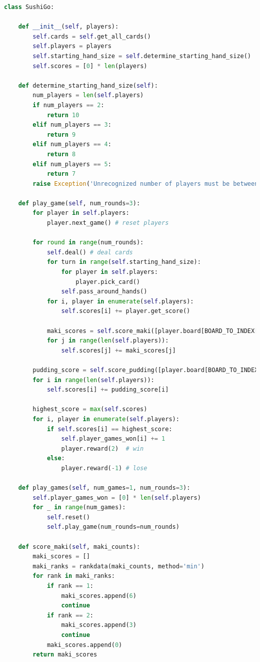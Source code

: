\begin{lstlisting}[language=Python]
class SushiGo:

    def __init__(self, players):
        self.cards = self.get_all_cards()
        self.players = players
        self.starting_hand_size = self.determine_starting_hand_size()
        self.scores = [0] * len(players)
    
    def determine_starting_hand_size(self):
        num_players = len(self.players)
        if num_players == 2:
            return 10
        elif num_players == 3:
            return 9
        elif num_players == 4:
            return 8
        elif num_players == 5:
            return 7
        raise Exception('Unrecognized number of players must be between 2 - 5 players')

    def play_game(self, num_rounds=3):
        for player in self.players: 
            player.next_game() # reset players

        for round in range(num_rounds):
            self.deal() # deal cards
            for turn in range(self.starting_hand_size):
                for player in self.players: 
                    player.pick_card()
                self.pass_around_hands()
            for i, player in enumerate(self.players): 
                self.scores[i] += player.get_score()

            maki_scores = self.score_maki([player.board[BOARD_TO_INDEX[MAKI]] * -1 for player in self.players])
            for j in range(len(self.players)):
                self.scores[j] += maki_scores[j]

        pudding_score = self.score_pudding([player.board[BOARD_TO_INDEX[PUDDING]] * -1 for player in self.players])
        for i in range(len(self.players)):
            self.scores[i] += pudding_score[i]

        highest_score = max(self.scores)
        for i, player in enumerate(self.players):
            if self.scores[i] == highest_score:
                self.player_games_won[i] += 1
                player.reward(2)  # win
            else:
                player.reward(-1) # lose

    def play_games(self, num_games=1, num_rounds=3):
        self.player_games_won = [0] * len(self.players)
        for _ in range(num_games):
            self.reset()
            self.play_game(num_rounds=num_rounds)
    
    def score_maki(self, maki_counts):
        maki_scores = []
        maki_ranks = rankdata(maki_counts, method='min')
        for rank in maki_ranks:
            if rank == 1:
                maki_scores.append(6)
                continue
            if rank == 2:
                maki_scores.append(3)
                continue
            maki_scores.append(0)
        return maki_scores


\end{lstlisting}

